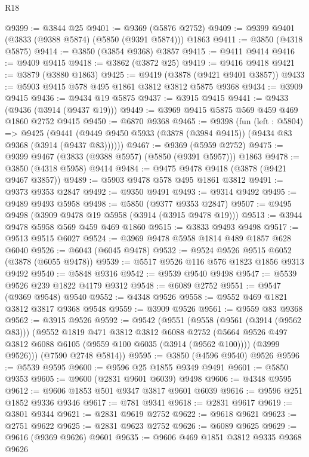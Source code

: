 \begin{lexlean}{R18}
\begin{coremodule}
@9399 := @3844 @25
@9401 := @9369 (@5876 @2752)
@9409 := @9399 @9401 (@3833 (@9388 @5874) (@5850 (@9391 @5874))) @1863
@9411 := @3850 (@4318 @5875)
@9414 := @3850 (@3854 @9368) @3857
@9415 := @9411 @9414
@9416 := @9409 @9415
@9418 := @3862 (@3872 @25)
@9419 := @9416 @9418
@9421 := @3879 (@3880 @1863)
@9425 := @9419 (@3878 (@9421 @9401 @3857))
@9433 := @5903 @9415 @578 @495 @1861 @3812 @3812 @5875 @9368
@9434 := @3909 @9415
@9436 := @9434 @19 @5875
@9437 := @3915 @9415
@9441 := @9433 (@9436 (@3914 (@9437 @19)))
@9449 := @3969 @9415 @5875 @569 @459 @469 @1860 @2752 @9415
@9450 := @6870 @9368
@9465 := @9398
    (fun (left : @5804) =>
    @9425 (@9441 (@9449 @9450 @5933 (@3878 (@3984 @9415)) (@9434 @83 @9368 (@3914 (@9437 @83))))))
@9467 := @9369 (@5959 @2752)
@9475 := @9399 @9467 (@3833 (@9388 @5957) (@5850 (@9391 @5957))) @1863
@9478 := @3850 (@4318 @5958) @9414
@9484 := @9475 @9478 @9418 (@3878 (@9421 @9467 @3857))
@9489 := @5903 @9478 @578 @495 @1861 @3812
@9491 := @9373 @9353 @2847
@9492 := @9350 @9491
@9493 := @9314 @9492
@9495 := @9489 @9493 @5958
@9498 := @5850 (@9377 @9353 @2847)
@9507 := @9495 @9498 (@3909 @9478 @19 @5958 (@3914 (@3915 @9478 @19)))
@9513 := @3944 @9478 @5958 @569 @459 @469 @1860
@9515 := @3833 @9493 @9498
@9517 := @9513 @9515 @6027
@9524 := @3969 @9478 @5958 @1814 @489 @1857 @628 @6040
@9526 := @6043 (@6045 @9478)
@9532 := @9524 @9526 @9515 @6052 (@3878 (@6055 @9478))
@9539 := @5517 @9526 @116 @576 @1823 @1856 @9313 @9492
@9540 := @5848 @9316
@9542 := @9539 @9540 @9498
@9547 := @5539 @9526 @239 @1822 @4179 @9312
@9548 := @6089 @2752
@9551 := @9547 (@9369 @9548) @9540
@9552 := @4348 @9526
@9558 := @9552 @469 @1821 @3812 @3817 @9368 @9548
@9559 := @3909 @9526
@9561 := @9559 @83 @9368
@9562 := @3915 @9526
@9592 := @9542
    (@9551
      (@9558
        (@9561 (@3914 (@9562 @83)))
        (@9552
          @1819
          @471
          @3812
          @3812
          @6088
          @2752
          (@5664 @9526 @497 @3812 @6088 @6105 (@9559 @100 @6035 (@3914 (@9562 @100))))
          (@3999 @9526)))
      (@7590 @2748 @5814))
@9595 := @3850 (@4596 @9540) @9526
@9596 := @5539 @9595
@9600 := @9596 @25 @1855 @9349 @9491
@9601 := @5850 @9353
@9605 := @9600 (@2831 @9601 @6039) @9498
@9606 := @4348 @9595
@9612 := @9606 @1853 @501 @9347 @3817 @9601 @6039
@9616 := @9596 @251 @1852 @9336 @9346
@9617 := @781 @9341
@9618 := @2831 @9617
@9619 := @3801 @9344
@9621 := @2831 @9619 @2752
@9622 := @9618 @9621
@9623 := @2751 @9622
@9625 := @2831 @9623 @2752
@9626 := @6089 @9625
@9629 := @9616 (@9369 @9626) @9601
@9635 := @9606 @469 @1851 @3812 @9335 @9368 @9626

\end{coremodule}
\end{lexlean}

